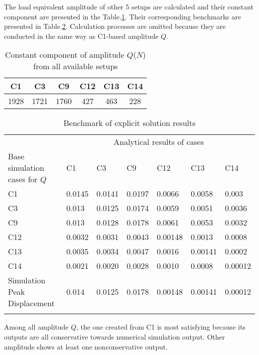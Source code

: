 The load equivalent amplitude of other 5 setups are calculated and their constant component are presented in the Table.\ref{tab:allLoadEquivalentAmplitude}. Their corresponding benchmarks are presented in Table.\ref{tab:allBenchmark}. Calculation processes are omitted because they are conducted in the same way as C1-based amplitude $Q$.

\begin{table}[h!]
    \centering
    \caption{Constant component of amplitude $Q$($N$) from all available setups}
    \begin{tabular}{cccccc}
        \hline
        C1 & C3 & C9 & C12 & C13 & C14 \\
        \hline
        1928 & 1721 & 1760 & 427 & 463 & 228 \\
        \hline
    \end{tabular}
    \label{tab:allLoadEquivalentAmplitude}
\end{table}

\begin{table}[h!]
	\tiny
    \centering
    \caption{Benchmark of explicit solution results}
    \begin{tabularx}{\textwidth}{XXXXXXX}
        \hline
         & \multicolumn{6}{c}{Analytical results of cases}\\
        \cline{2-7}
        Base simulation cases for $Q$ & C1 & C3 & C9 & C12 & C13 & C14 \\
        \hline
        C1 & 0.0145 & 0.0141 & 0.0197 & 0.0066 & 0.0058 & 0.003 \\
        C3 & 0.013 & 0.0125 & 0.0174 & 0.0059 & 0.0051 & 0.0036 \\
        C9 & 0.013 & 0.0128 & 0.0178 & 0.0061 & 0.0053 & 0.0032 \\
        C12 & 0.0032 & 0.0031 & 0.0043 & 0.00148 & 0.0013 & 0.0008 \\
        C13 & 0.0035 & 0.0034 & 0.0047 & 0.0016 & 0.00141 & 0.0002 \\
        C14 & 0.0021 & 0.0020 & 0.0028 & 0.0010 & 0.0008 & 0.00012 \\
        \hline
        Simulation Peak Displacement & 0.014 & 0.0125 & 0.0178 & 0.00148 & 0.00141 & 0.00012 \\
        \hline
        \label{tab:allBenchmark}
    \end{tabularx}
\end{table}

Among all amplitude $Q$, the one created from C1 is most satisfying because its outputs are all conservative towards numerical simulation output. Other  amplitude shows at least one nonconservative output. 

